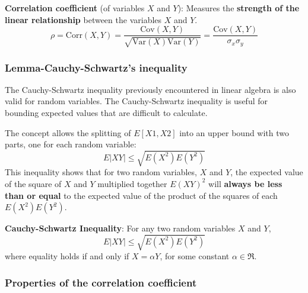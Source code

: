 \documentclass[10pt,a4paper]{article}
\begin{document}
\begin{tcolorbox}[breakable,colback=white]
\textbf{Correlation coefficient} (of variables $X$ and $Y$): Measures the \textbf{strength of the
linear relationship} between the variables $X$ and $Y$.
$$
    \rho = \text{Corr}(X,Y) = \frac{\text{Cov}(X,Y)}{\sqrt{\text{Var}(X)\text{Var}(Y)}} = \frac{\text{Cov}(X,Y)}{\sigma_x \sigma_y}
$$
\end{tcolorbox}

\subsubsection{Lemma-Cauchy-Schwartz's inequality}

The Cauchy-Schwartz inequality previously encountered in linear algebra is also valid for random
variables. The Cauchy-Schwartz inequality is useful for bounding expected values that are difficult to calculate.

The concept allows the splitting of $E[X1, X2]$ into an upper bound with two parts, one for each
random variable:
$$
    E|XY| \leq \sqrt{E(X^2)E(Y^2)}
$$
This inequality shows that for two random variables, $X$ and $Y$, the expected value of the square
of $X$ and $Y$ multiplied together $E(XY)^2$ will \textbf{always be less than or equal} to the expected value of the
product of the squares of each $E(X^2)E(Y^2)$.

\begin{tcolorbox}[breakable,colback=white]
\textbf{Cauchy-Schwartz Inequality}:
For any two random variables $X$ and $Y$,
$$
    E|XY| \leq \sqrt{E(X^2)E(Y^2)}
$$
where equality holds if and only if $X = \alpha Y$, for some constant $\alpha \in \Re$.
\end{tcolorbox}

\subsubsection{Properties of the correlation coefficient}
\end{document}
